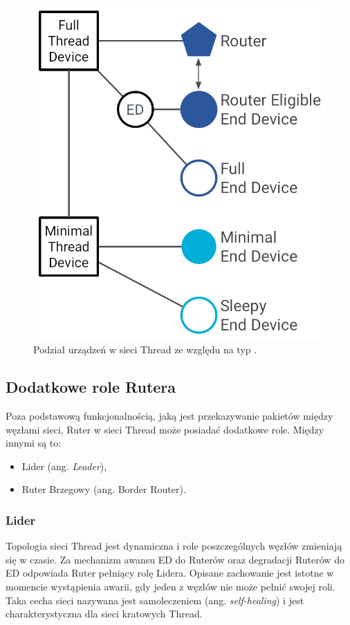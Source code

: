         \begin{figure}[H]
            \centering
            \includegraphics[width=0.8\linewidth]{graphics/external/ot-primer-taxonomy.png}
            \caption{Podział urządzeń w sieci Thread ze względu na typ \cite{ot-devices}.}
            \label{fig:thread-device-taxonomy}
        \end{figure}

    \subsection{Dodatkowe role Rutera}

        Poza podstawową funkcjonalnością, jaką jest przekazywanie pakietów między węzłami sieci, Ruter w sieci Thread może posiadać dodatkowe role. Między innymi są to:
        \begin{itemize}
            \item Lider (ang. \textit{Leader}),
            \item Ruter Brzegowy (ang. Border Router).
        \end{itemize}

        \subsubsection{Lider}

        Topologia sieci Thread jest dynamiczna i role poszczególnych węzłów zmieniają się w czasie. Za mechanizm awansu ED do Ruterów oraz degradacji Ruterów do ED odpowiada Ruter pełniący rolę Lidera. Opisane zachowanie jest istotne w momencie wystąpienia awarii, gdy jeden z węzłów nie może pełnić swojej roli. Taka cecha sieci nazywana jest samoleczeniem (ang. \textit{self-healing}) i jest charakterystyczna dla sieci kratowych Thread.


